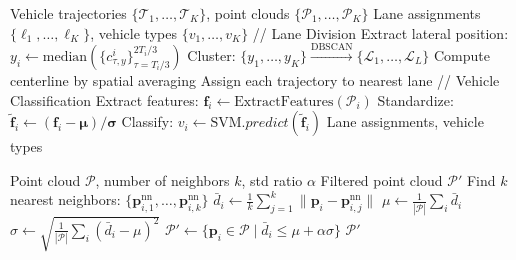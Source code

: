 \begin{algorithm}[H]
\caption{Unsupervised Lane Division and Vehicle Classification}
\label{alg:lane_classification}
\begin{algorithmic}[1]
\REQUIRE Vehicle trajectories $\{\mathcal{T}_1, \ldots, \mathcal{T}_K\}$, point clouds $\{\mathcal{P}_1, \ldots, \mathcal{P}_K\}$
\ENSURE Lane assignments $\{\ell_1, \ldots, \ell_K\}$, vehicle types $\{v_1, \ldots, v_K\}$
\STATE // Lane Division
    \STATE Extract lateral position: $y_i \leftarrow \text{median}(\{c_{\tau,y}^i\}_{\tau=T_i/3}^{2T_i/3})$
\ENDFOR
\STATE Cluster: $\{y_1, \ldots, y_K\} \xrightarrow{\text{DBSCAN}} \{\mathcal{L}_1, \ldots, \mathcal{L}_L\}$
    \STATE Compute centerline by spatial averaging
\ENDFOR
\STATE Assign each trajectory to nearest lane
\STATE // Vehicle Classification
    \STATE Extract features: $\mathbf{f}_i \leftarrow \text{ExtractFeatures}(\mathcal{P}_i)$
    \STATE Standardize: $\tilde{\mathbf{f}}_i \leftarrow (\mathbf{f}_i - \boldsymbol{\mu}) / \boldsymbol{\sigma}$
    \STATE Classify: $v_i \leftarrow \text{SVM}.predict(\tilde{\mathbf{f}}_i)$
\ENDFOR
\RETURN Lane assignments, vehicle types
\end{algorithmic}
\end{algorithm}


\begin{algorithm}[H]
\caption{Statistical Outlier Removal (SOR)}
\label{alg:sor}
\begin{algorithmic}[1]
\REQUIRE Point cloud $\mathcal{P}$, number of neighbors $k$, std ratio $\alpha$
\ENSURE Filtered point cloud $\mathcal{P}'$
    \STATE Find $k$ nearest neighbors: $\{\mathbf{p}_{i,1}^{\text{nn}}, \ldots, \mathbf{p}_{i,k}^{\text{nn}}\}$
    \STATE $\bar{d}_i \leftarrow \frac{1}{k} \sum_{j=1}^{k} \|\mathbf{p}_i - \mathbf{p}_{i,j}^{\text{nn}}\|$
\ENDFOR
\STATE $\mu \leftarrow \frac{1}{|\mathcal{P}|} \sum_i \bar{d}_i$
\STATE $\sigma \leftarrow \sqrt{\frac{1}{|\mathcal{P}|} \sum_i (\bar{d}_i - \mu)^2}$
\STATE $\mathcal{P}' \leftarrow \{\mathbf{p}_i \in \mathcal{P} \mid \bar{d}_i \leq \mu + \alpha \sigma\}$
\RETURN $\mathcal{P}'$
\end{algorithmic}
\end{algorithm}


